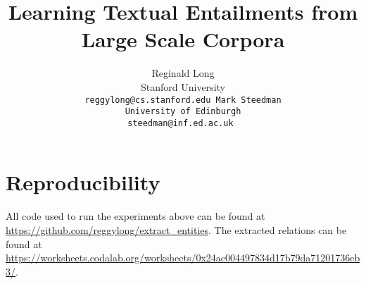 \documentclass[11pt]{article}
\title{Learning Textual Entailments from Large Scale Corpora}
\author{
  Reginald Long \\
  Stanford University \\
  \tt{reggylong@cs.stanford.edu}
\And
  Mark Steedman \\
  University of Edinburgh \\
  \tt{steedman@inf.ed.ac.uk}
}
\date{}
\begin{document}
\maketitle

\begin{abstract}
  
\end{abstract}


 




\section{Reproducibility}
All code used to run the experiments above can be
found at \url{https://github.com/reggylong/extract_entities}.
The extracted relations can be found at 
\url{https://worksheets.codalab.org/worksheets/0x24ac004497834d17b79da71201736eb3/}.



\end{document}
